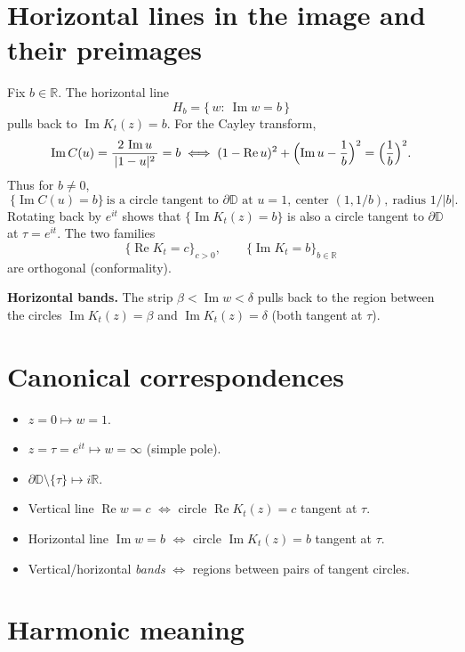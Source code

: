 \documentclass[11pt]{article}
\begin{document}
	\section*{Horizontal lines in the image and their preimages}
	
	Fix $b\in\mathbb{R}$. The horizontal line
	\[
	H_b=\{\,w:\ \operatorname{Im} w=b\,\}
	\]
	pulls back to $\operatorname{Im} K_t(z)=b$. For the Cayley transform,
	\[
	\operatorname{Im} C(u)=\frac{2\,\operatorname{Im} u}{\,|1-u|^2\,}=b
	\iff
	(1-\operatorname{Re} u)^2+\Bigl(\operatorname{Im} u-\frac{1}{b}\Bigr)^2=\Bigl(\frac{1}{b}\Bigr)^2.
	\]
	Thus for $b\neq 0$,
	\[
	\boxed{\ \{\operatorname{Im} C(u)=b\}\ \text{is a circle tangent to }\partial\mathbb{D}\text{ at }u=1,\ 
		\text{center }(1,1/b),\ \text{radius }1/|b|. }
	\]
	Rotating back by $e^{it}$ shows that $\{\operatorname{Im} K_t(z)=b\}$ is also a circle tangent to $\partial\mathbb{D}$ at $\tau=e^{it}$. The two families
	\[
	\{\operatorname{Re} K_t=c\}_{c>0},\qquad \{\operatorname{Im} K_t=b\}_{b\in\mathbb{R}}
	\]
	are orthogonal (conformality).
	
	\medskip
	
	\textbf{Horizontal bands.}
	The strip $\beta<\operatorname{Im} w<\delta$ pulls back to the region between
	the circles $\operatorname{Im} K_t(z)=\beta$ and $\operatorname{Im} K_t(z)=\delta$ (both tangent at $\tau$).
	
	\section*{Canonical correspondences}
	
	\begin{itemize}
		\item $z=0 \mapsto w=1$.
		\item $z=\tau=e^{it}\mapsto w=\infty$ (simple pole).
		\item $\partial\mathbb{D}\setminus\{\tau\}\mapsto i\mathbb{R}$.
		\item Vertical line $\operatorname{Re} w=c$ $\Longleftrightarrow$ circle $\operatorname{Re} K_t(z)=c$ tangent at $\tau$.
		\item Horizontal line $\operatorname{Im} w=b$ $\Longleftrightarrow$ circle $\operatorname{Im} K_t(z)=b$ tangent at $\tau$.
		\item Vertical/horizontal \emph{bands} $\Longleftrightarrow$ regions between pairs of tangent circles.
	\end{itemize}
	
	\section*{Harmonic meaning}
	
\end{document}
